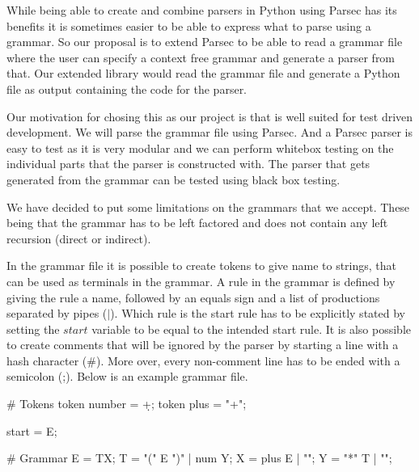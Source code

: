 While being able to create and combine parsers in Python using Parsec has its benefits it is sometimes easier to be able to express what to parse using a grammar. So our proposal is to extend Parsec to be able to read a grammar file where the user can specify a context free grammar and generate a parser from that. Our extended library would read the grammar file and generate a Python file as output containing the code for the parser.\par
Our motivation for chosing this as our project is that is well suited for test driven development. We will parse the grammar file using Parsec. And a Parsec parser is easy to test as it is very modular and we can perform whitebox testing on the individual parts that the parser is constructed with. The parser that gets generated from the grammar can be tested using black box testing.\par
We have decided to put some limitations on the grammars that we accept. These being that the grammar has to be left factored and does not contain any left recursion (direct or indirect).\par
In the grammar file it is possible to create tokens to give name to strings, that can be used as terminals in the grammar. A rule in the grammar is defined by giving the rule a name, followed by an equals sign and a list of productions separated by pipes ($\vert$). Which rule is the start rule has to be explicitly stated by setting the $start$ variable to be equal to the intended start rule. It is also possible to create comments that will be ignored by the parser by starting a line with a hash character (\#). More over, every non-comment line has to be ended with a semicolon (;). Below is an example grammar file.
\begin{python}
# Tokens
token number = \d+;
token plus = "+";

start = E;

# Grammar
E = TX;
T = "(" E ")" | num Y;
X = plus E | "";
Y = "*" T  | "";
\end{python}
